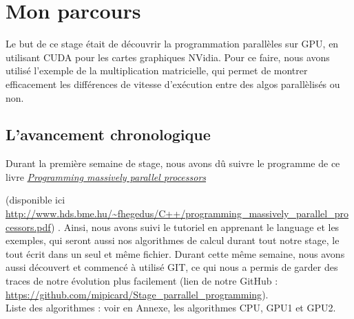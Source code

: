 \documentclass[a4paper,12pt]{article}
\begin{document}
{{	\section{Mon parcours}
	\indent Le but de ce stage \'e{}tait de d\'e{}couvrir la programmation parall\`eles sur GPU, en utilisant CUDA pour les cartes graphiques NVidia. Pour ce faire, nous avons utilis\'e l'exemple de la multiplication matricielle, qui permet de montrer efficacement les diff\'e{}rences de vitesse d'ex\'e{}cution entre des algos parall\`elis\'e{}s ou non.
	\subsection{L'avancement chronologique}
	\indent Durant la premi\`ere semaine de stage, nous avons d\^u suivre le programme de ce livre \href{http://www.hds.bme.hu/~fhegedus/C++/programming_massively_parallel_processors.pdf}\textit{Programming massively parallel processors}} (disponible ici \url{http://www.hds.bme.hu/~fhegedus/C++/programming_massively_parallel_processors.pdf}) . Ainsi, nous avons suivi le tutoriel en apprenant le language et les exemples, qui seront aussi nos algorithmes de calcul durant tout notre stage, le tout \'e{}crit dans un seul et m\^eme fichier. Durant cette m\^eme semaine, nous avons aussi d\'e{}couvert et commenc\'e \`a utilis\'e GIT, ce qui nous a permis de garder des traces de notre \'evolution plus facilement (lien de notre GitHub : \url{https://github.com/mipicard/Stage_parrallel_programming}).\\
	Liste des algorithmes : voir en Annexe, les algorithmes CPU, GPU1 et GPU2.
	
}
\end{document}
